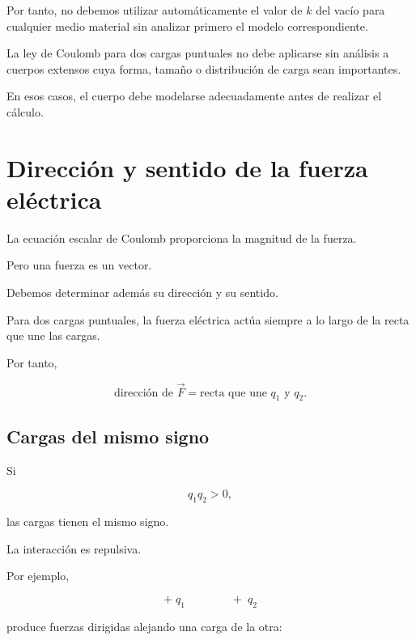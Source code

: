 Por tanto, no debemos utilizar automáticamente el valor de \(k\) del vacío
para cualquier medio material sin analizar primero el modelo correspondiente.

\begin{advertencia}

La ley de Coulomb para dos cargas puntuales no debe aplicarse sin análisis a
cuerpos extensos cuya forma, tamaño o distribución de carga sean importantes.

En esos casos, el cuerpo debe modelarse adecuadamente antes de realizar el
cálculo.

\end{advertencia}



\section{Dirección y sentido de la fuerza eléctrica}

La ecuación escalar de Coulomb proporciona la magnitud de la fuerza.

Pero una fuerza es un vector.

Debemos determinar además su dirección y su sentido.

Para dos cargas puntuales, la fuerza eléctrica actúa siempre a lo largo de
la recta que une las cargas.

Por tanto,

\[
\boxed{
\text{dirección de }\vec{F}
=
\text{recta que une }q_1\text{ y }q_2
}.
\]



\subsection{Cargas del mismo signo}

Si

\[
q_1q_2>0,
\]

las cargas tienen el mismo signo.

La interacción es repulsiva.

Por ejemplo,

\[
+\;q_1
\qquad\qquad
+\;q_2
\]

produce fuerzas dirigidas alejando una carga de la otra:

